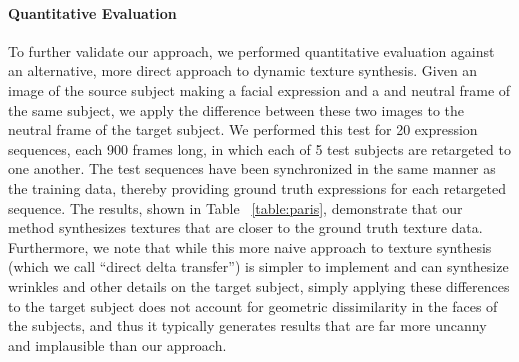 \paragraph{Quantitative Evaluation}

To further validate our approach, we performed quantitative evaluation against an alternative, more direct approach to dynamic texture synthesis. Given an image of the source subject making a facial expression and a and neutral frame of the same subject, we apply the difference between these two images to the neutral frame of the target subject. We performed this test for 20 expression sequences, each 900 frames long, in which each of 5 test subjects are retargeted to one another. The test sequences have been synchronized in the same manner as the training data, thereby providing ground truth expressions for each retargeted sequence. The results, shown in Table ~\ref{table:paris}, demonstrate that our method synthesizes textures that are closer to the ground truth texture data. Furthermore, we note that while this more naive approach to texture synthesis (which we call ``direct delta transfer'') is simpler to implement and can synthesize wrinkles and other details on the target subject, simply applying these differences to the target subject does not account for geometric dissimilarity in the faces of the subjects, and thus it typically generates results that are far more uncanny and implausible than our approach.





